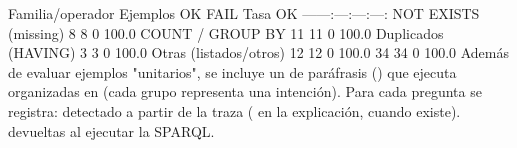 {}\markdownRendererPipe{} Familia/operador \markdownRendererPipe{} \markdownRendererBackslash{}\markdownRendererHash{}Ejemplos \markdownRendererPipe{} \markdownRendererBackslash{}\markdownRendererHash{}OK \markdownRendererPipe{} \markdownRendererBackslash{}\markdownRendererHash{}FAIL \markdownRendererPipe{} Tasa OK \markdownRendererPipe{} \markdownRendererPipe{}---\markdownRendererPipe{}---:\markdownRendererPipe{}---:\markdownRendererPipe{}---:\markdownRendererPipe{}---:\markdownRendererPipe{} \markdownRendererPipe{} NOT EXISTS (missing) \markdownRendererPipe{} 8 \markdownRendererPipe{} 8 \markdownRendererPipe{} 0 \markdownRendererPipe{} 100.0\markdownRendererBackslash{}\markdownRendererPercentSign{} \markdownRendererPipe{} \markdownRendererPipe{} COUNT / GROUP BY \markdownRendererPipe{} 11 \markdownRendererPipe{} 11 \markdownRendererPipe{} 0 \markdownRendererPipe{} 100.0\markdownRendererBackslash{}\markdownRendererPercentSign{} \markdownRendererPipe{} \markdownRendererPipe{} Duplicados (HAVING) \markdownRendererPipe{} 3 \markdownRendererPipe{} 3 \markdownRendererPipe{} 0 \markdownRendererPipe{} 100.0\markdownRendererBackslash{}\markdownRendererPercentSign{} \markdownRendererPipe{} \markdownRendererPipe{} Otras (listados/otros) \markdownRendererPipe{} 12 \markdownRendererPipe{} 12 \markdownRendererPipe{} 0 \markdownRendererPipe{} 100.0\markdownRendererBackslash{}\markdownRendererPercentSign{} \markdownRendererPipe{} \markdownRendererPipe{}  \markdownRendererPipe{} 34 \markdownRendererPipe{} 34 \markdownRendererPipe{} 0 \markdownRendererPipe{} 100.0\markdownRendererBackslash{}\markdownRendererPercentSign{} \markdownRendererPipe{}\markdownRendererInterblockSeparator
{}\markdownRendererInterblockSeparator
{}Además de evaluar ejemplos "unitarios", se incluye un  de paráfrasis () que ejecuta  organizadas en  (cada grupo representa una intención). Para cada pregunta se registra:\markdownRendererInterblockSeparator
{}\markdownRendererUlBeginTight
\markdownRendererUlItem {} detectado a partir de la traza ( en la explicación, cuando existe).\markdownRendererUlItemEnd 
\markdownRendererUlItem {} devueltas al ejecutar la SPARQL.\markdownRendererUlItemEnd 
